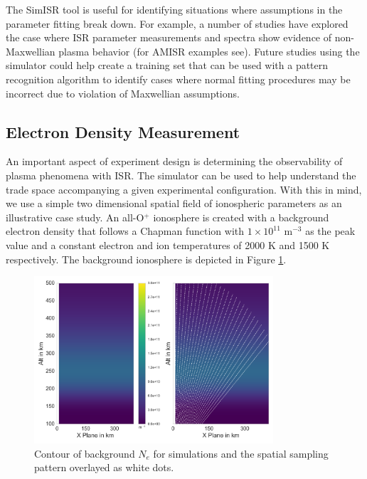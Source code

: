 The SimISR tool is useful for identifying situations where assumptions in the parameter fitting break down. For example, a number of studies have explored the case where ISR parameter measurements and spectra show evidence of non-Maxwellian plasma behavior (for AMISR examples see)\cite{Akbari:2012dz,Akbari:2015fv}. Future studies using the simulator could help create a training set that can be used with a pattern recognition algorithm to identify cases where normal fitting procedures may be incorrect due to violation of Maxwellian assumptions.

\subsection{Electron Density Measurement}
An important aspect of experiment design is determining the observability of plasma phenomena with ISR. The simulator can be used to help understand the trade space accompanying a given experimental configuration. With this in mind, we use a simple two dimensional spatial field of ionospheric parameters as an illustrative case study. An all-O$^+$ ionosphere is created with a background electron density that follows a Chapman function with $1\times10^{11}$ m$^{-3}$ as the peak value and a constant electron and ion temperatures of 2000 K and 1500 K respectively. The background ionosphere is depicted in Figure \ref{fig:background1}.

\begin{figure}[!t]
\centering
\includegraphics[width=3.5in]{backgroundandsamp}
\caption{Contour of background $N_e$ for simulations and the spatial sampling pattern overlayed as white dots.}
\label{fig:background1}
\end{figure}

